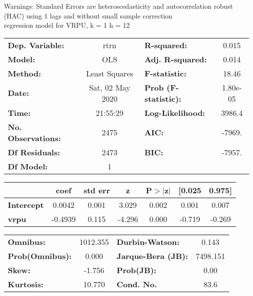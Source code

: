 Warnings: \newline
 [1] Standard Errors are heteroscedasticity and autocorrelation robust (HAC) using 1 lags and without small sample correction\\ 

regression model for VRPU, k = 1 h = 12\begin{center}
\begin{tabular}{lclc}
\toprule
\textbf{Dep. Variable:}    &       rtrn       & \textbf{  R-squared:         } &     0.015   \\
\textbf{Model:}            &       OLS        & \textbf{  Adj. R-squared:    } &     0.014   \\
\textbf{Method:}           &  Least Squares   & \textbf{  F-statistic:       } &     18.46   \\
\textbf{Date:}             & Sat, 02 May 2020 & \textbf{  Prob (F-statistic):} &  1.80e-05   \\
\textbf{Time:}             &     21:55:29     & \textbf{  Log-Likelihood:    } &    3986.4   \\
\textbf{No. Observations:} &        2475      & \textbf{  AIC:               } &    -7969.   \\
\textbf{Df Residuals:}     &        2473      & \textbf{  BIC:               } &    -7957.   \\
\textbf{Df Model:}         &           1      & \textbf{                     } &             \\
\bottomrule
\end{tabular}
\begin{tabular}{lcccccc}
                   & \textbf{coef} & \textbf{std err} & \textbf{z} & \textbf{P$> |$z$|$} & \textbf{[0.025} & \textbf{0.975]}  \\
\midrule
\textbf{Intercept} &       0.0042  &        0.001     &     3.029  &         0.002        &        0.001    &        0.007     \\
\textbf{vrpu}      &      -0.4939  &        0.115     &    -4.296  &         0.000        &       -0.719    &       -0.269     \\
\bottomrule
\end{tabular}
\begin{tabular}{lclc}
\textbf{Omnibus:}       & 1012.355 & \textbf{  Durbin-Watson:     } &    0.143  \\
\textbf{Prob(Omnibus):} &   0.000  & \textbf{  Jarque-Bera (JB):  } & 7498.151  \\
\textbf{Skew:}          &  -1.756  & \textbf{  Prob(JB):          } &     0.00  \\
\textbf{Kurtosis:}      &  10.770  & \textbf{  Cond. No.          } &     83.6  \\
\bottomrule
\end{tabular}
\end{center}

